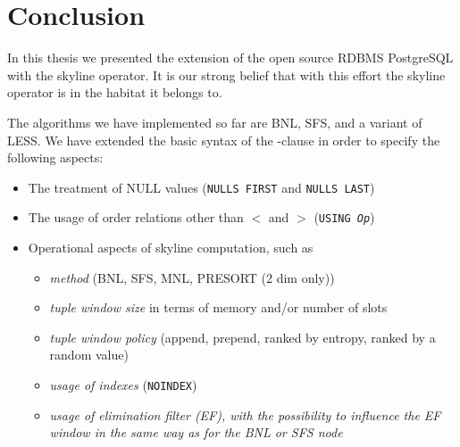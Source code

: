 %






\chapter{Conclusion}
\label{chap:summary}

In this thesis we presented the extension of the open source
RDBMS PostgreSQL with the skyline operator.  It is our strong belief that with
this effort the skyline operator is in the habitat it belongs to.

The algorithms we have implemented so far are BNL, SFS, and a variant
of LESS.  
We have extended the basic syntax of the -clause
\citep{Borzsonyi2001} in order to specify the following aspects:

\begin{itemize}
\item The treatment of NULL values (\texttt{NULLS FIRST} and \texttt{NULLS LAST})
\item The usage of order relations other than $<$ and $>$ (\texttt{USING \emph{Op}})
\item Operational aspects of skyline computation, such as 
\begin{itemize}
\item \emph{method} (BNL, SFS, MNL, PRESORT (2 dim only))
\item \emph{tuple window size} in terms of memory and/or number of slots
\item \emph{tuple window policy} (append, prepend, ranked by entropy, ranked by a random value)
\item \emph{usage of indexes} (\texttt{NOINDEX})
\item \emph{usage of elimination filter (EF), 
  	with the possibility to influence the EF window in the same way
  	as for the BNL or SFS node}
\end{itemize}
\end{itemize}


